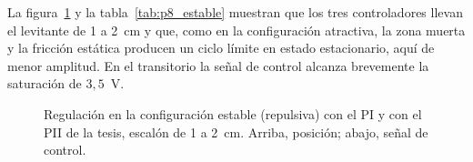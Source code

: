 La figura~\ref{fig:p8_estable} y la tabla~\ref{tab:p8_estable} muestran que los tres controladores llevan el levitante de 1 a 2~cm y que, como en la configuración atractiva, la zona muerta y la fricción estática producen un ciclo límite en estado estacionario, aquí de menor amplitud. En el transitorio la señal de control alcanza brevemente la saturación de $3{,}5$~V.

\begin{figure}[ht]
    \centering
    
    \caption[Configuración estable]{Regulación en la configuración estable (repulsiva) con el PI y con el PII de la tesis, escalón de 1 a 2~cm. Arriba, posición; abajo, señal de control.}
    \label{fig:p8_estable}
\end{figure}

\FloatBarrier
